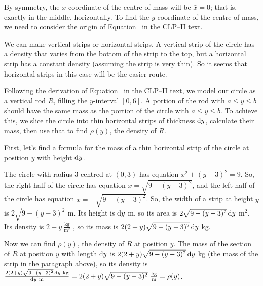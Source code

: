 \begin{solution}
By symmetry, the $x$-coordinate of the centre of mass will be $\bar x =0$; that is, exactly in the middle, horizontally. To find the $y$-coordinate of the centre of mass, we need to consider the origin of Equation~ in the CLP--II text.

We can make vertical strips or horizontal strips. A vertical strip of the circle has a density that varies from the bottom of the strip to the top, but a horizontal strip has a constant density (assuming the strip is very thin). So it seems that horizontal strips in this case will be the easier route.

Following the derivation of Equation~ in the CLP--II text, we model our circle as a vertical rod $R$, filling the $y$-interval $[0, 6]$. A portion of the rod with $a \le y \le b$ should have the same mass as the portion of the circle with $a \le y \le b$. To achieve this, we slice the circle into thin horizontal strips of thickness $\mathrm{d}y$, calculate their mass, then use that to find $\rho(y)$, the density of $R$.

{First, let's find a formula for the mass of a thin horizontal strip of the circle at position $y$ with height $\mathrm{d}y$.}

\begin{center}
\end{center}

The circle with radius 3 centred at $(0,3)$ has equation $x^2+(y-3)^2=9$. So, the right half of the circle has equation $x=\sqrt{9-(y-3)^2}$, and the left half of the circle has equation $x=-\sqrt{9-(y-3)^2}$. So, the width of a strip at height $y$ is $2\sqrt{9-(y-3)^2}$ m. Its height is $\mathrm{d}y$ m, so its area is $2\sqrt{9-(y-3)^2}\,\mathrm{d}y$ m$^2$. Its density is $2+y~\frac{\text{kg}}{\text{m}^2}$ , so its mass is $2(2+y)\sqrt{9-(y-3)^2}\,\mathrm{d}y$ kg.

Now we can find $\rho(y)$, the density of $R$ at position $y$. The mass of the section of $R$ at position $y$ with length $\mathrm{d}y$ is $2(2+y)\sqrt{9-(y-3)^2}\,\mathrm{d}y$ kg (the mass of the strip in the paragraph above), so its density is $\frac{2(2+y)\sqrt{9-(y-3)^2}\,\mathrm{d}y~\text{kg}}{\mathrm{d}y~\text{m}} = 2(2+y)\sqrt{9-(y-3)^2}~\frac{\text{kg}}{\text{m}} = \rho(y)$.


\end{solution}
